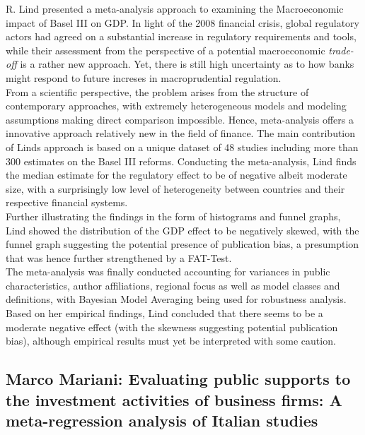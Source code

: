 \documentclass[a4paper,man,natbib]{apa6}
\begin{document}
R. Lind presented a meta-analysis approach to examining the Macroeconomic impact of Basel III on GDP. In light of the 2008 financial crisis, global regulatory actors had agreed on a substantial increase in regulatory requirements and tools, while their assessment from the perspective of a potential macroeconomic \textit{trade-off} is a rather new approach. Yet, there is still high uncertainty as to how banks might respond to future increses in macroprudential regulation. \\
From a scientific perspective, the problem arises from the structure of contemporary approaches, with extremely heterogeneous models and modeling assumptions making direct comparison impossible. Hence, meta-analysis offers a innovative approach relatively new in the field of finance. 
The main contribution of Linds approach is based on a unique dataset of 48 studies including more than 300 estimates on the Basel III reforms. Conducting the meta-analysis, Lind finds the median estimate for the regulatory effect to be of negative albeit moderate size, with a surprisingly low level of heterogeneity between countries and their respective financial systems. \\
Further illustrating the findings in the form of histograms and funnel graphs, Lind showed the distribution of the GDP effect to be negatively skewed, with the funnel graph suggesting the potential presence of publication bias, a presumption that was hence further strengthened by a FAT-Test. \\
The meta-analysis was finally conducted accounting for variances in public characteristics, author affiliations, regional focus as well as model classes and definitions, with Bayesian Model Averaging being used for robustness analysis. Based on her empirical findings, Lind concluded that there seems to be a moderate negative effect (with the skewness suggesting potential publication bias), although empirical results must yet be interpreted with some caution.

\subsection{Marco Mariani: Evaluating public supports to the investment activities of business firms: A meta-regression analysis of Italian studies}
\end{document}
